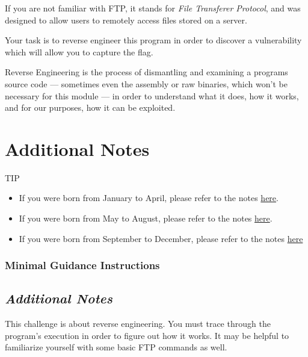 {{{                    If you are not familiar with FTP, it stands for \textit{File Transferer Protocol}, and was designed to allow users to remotely access files stored on a server. 

                    Your task is to reverse engineer this program in order to discover a vulnerability which will allow you to capture the flag.

                    Reverse Engineering is the process of dismantling and examining a programs source code — sometimes even the assembly or raw binaries, which won't be necessary for this module — in order to understand what it does, how it works, and for our purposes, how it can be exploited.
                \section*{Additional Notes}
                    TIP
                    \begin{itemize}
                        \item If you were born from January to April, please refer to the notes \href{https://github.com/brendonky18/Honors-Thesis.CTFs/blob/main/going-backwards/notes_0.md}{here}.
                        \item If you were born from May to August, please refer to the notes \href{https://github.com/brendonky18/Honors-Thesis.CTFs/blob/main/going-backwards/notes_1.md}{here}.
                        \item If you were born from September to December, please refer to the notes \href{https://github.com/brendonky18/Honors-Thesis.CTFs/blob/main/going-backwards/notes_1.md}{here}
                    \end{itemize}

            }
        \newpage
        \subsubsection{Minimal Guidance Instructions}
            {\parindent0pt\singlespacing
                \subsection*{\textit{Additional Notes}}
                    This challenge is about reverse engineering. %
You must trace through the program's execution in order to figure out how it works. %
It may be helpful to familiarize yourself with some basic FTP commands as well. 

}}}
